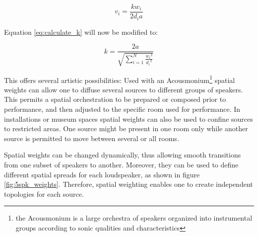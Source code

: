 \documentclass[twoside,10pt]{article}
\begin{document}
\begin{equation} \label{eq:inverse_distance_weighed}
v_{i} = \frac{k w_{i}}{2 d_{i} a} 
\end{equation}

Equation \ref{eq:calculate_k} will now be modified to:

\begin{equation} \label{eq:calculate_k_weighted}
k = \frac{2a}{\sqrt{\sum_{i=1}^{N} \frac{{w_{i}}^2}{{d_{i}}^2}}}
\end{equation}

This offers several artistic possibilities: Used with an Acousmonium\footnote{the Acousmonium is a large orchestra of speakers organized into instrumental groups according to sonic qualities and characteristics} \cite{Bayle:1993MusiqueAcousmatique} spatial weights can allow one to diffuse several sources to different groups of speakers. This permits a spatial orchestration to be prepared or composed prior to performance, and then adjusted to the specific room used for performance.  In installations or museum spaces spatial weights can also be used to confine sources to restricted areas. One source might be present in one room only while another source is permitted to move between several or all rooms.

Spatial weights can be changed dynamically, thus allowing smooth transitions from one subset of speakers to another. Moreover, they can be used to define different spatial spreads for each loudspeaker, as shown in figure \ref{fig:5spk_weights}. Therefore, spatial weighting enables one to create independent topologies for each source.





%
%
\end{document}
